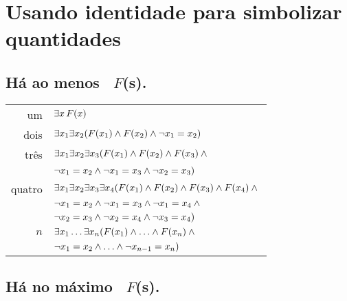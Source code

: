 
\newpage
\section{Usando identidade para simbolizar quantidades}

\subsection*{Há ao menos \blank\ $F$(s).}
\label{summary.atleast}

\begin{tabular*}{\textwidth}{rl}
um & $\exists x\,\mathord{F}(x)$\\
dois & $\exists x_1\exists x_2(\mathord{F}(x_1) \wedge \mathord{F}(x_2) \wedge \neg x_1  = x_2)$\\
três & $\exists x_1\exists x_2\exists x_3(\mathord{F}(x_1) \wedge \mathord{F}(x_2) \wedge \mathord{F}(x_3) \wedge {}$\\
& $\neg x_1 = x_2 \wedge\neg x_1 = x_3 \wedge \neg x_2 = x_3)$\\
quatro & $\exists x_1\exists x_2\exists x_3\exists x_4 (\mathord{F}(x_1) \wedge \mathord{F}(x_2) \wedge \mathord{F}(x_3) \wedge \mathord{F}(x_4) \wedge {}$\\
& $\neg x_1 = x_2 \wedge \neg x_1 = x_3 \wedge \neg x_1 = x_4 \wedge {}$\\
& $ \neg x_2 = x_3 \wedge \neg x_2 = x_4 \wedge \neg x_3 = x_4)$\\
$n$ & $\exists x_1\ldots\exists x_n(\mathord{F}(x_1) \wedge \ldots \wedge \mathord{F}(x_n) \wedge {}$\\
& $\neg x_1 = x_2 \wedge\ldots\wedge \neg x_{n-1} = x_n)$ 
\end{tabular*}

\subsection*{Há no máximo \blank\ $F$(s).}
\label{summary.atmost}

